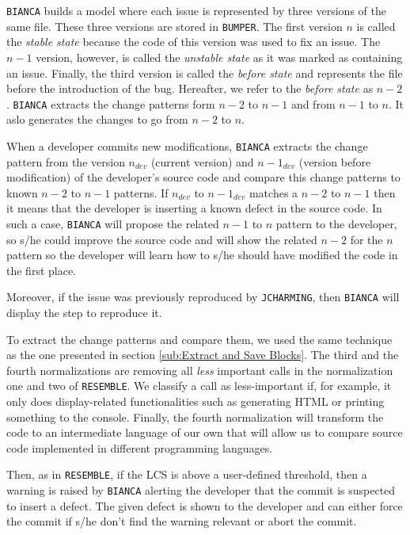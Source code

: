 {\tt BIANCA} builds a model where each issue is represented by three versions of the same file.
These three versions are stored in {\tt BUMPER}.
The first version $n$ is called the {\it stable state} because the code of this version was used to fix an issue.
The $n-1$ version, however, is called the {\it unstable state} as it was marked as containing an issue.
Finally, the third version is called the {\it before state} and represents the file before the introduction of the bug.
Hereafter, we refer to the {\it before state} as $n-2$.
{\tt BIANCA} extracts the change patterns form $n-2$ to $n-1$ and from $n-1$ to $n$.
It aslo generates the changes to go from $n-2$ to $n$.

When a developer commits new modifications, {\tt BIANCA} extracts the change pattern from the version $n_{dev}$ (current version) and $n-1_{dev}$ (version before modification) of the developer's source code and compare this change patterns to known $n-2$ to $n-1$ patterns.
If $n_{dev}$ to $n-1_{dev}$ matches a $n-2$ to $n-1$ then it means that the developer is inserting a known defect in the source code.
In such a case, {\tt BIANCA} will propose the related $n-1$ to $n$ pattern to the developer, so s/he could improve the source code and will show the related $n-2$ for the $n$ pattern so the developer will learn how to s/he should have modified the code in the first place.

Moreover, if the issue was previously reproduced by {\tt JCHARMING}, then {\tt BIANCA} will display the step to reproduce it.


To extract the change patterns and compare them, we used the same technique as the one presented in section \ref{sub:Extract and Save Blocks}.
The third and the fourth normalizations are removing all {\it less} important calls in the normalization one and two of {\tt RESEMBLE}.
We classify a call as less-important if, for example, it only does display-related functionalities such as generating HTML or printing something to the console. Finally, the fourth normalization will transform the code to an intermediate language of our own that will allow us to compare source code implemented in different programming languages.

Then, as in {\tt RESEMBLE}, if the LCS is above a user-defined threshold, then a warning is raised by {\tt BIANCA} alerting the developer that the commit is suspected to insert a defect.
The given defect is shown to the developer and can either force the commit if s/he don't find the warning relevant or abort the commit.


